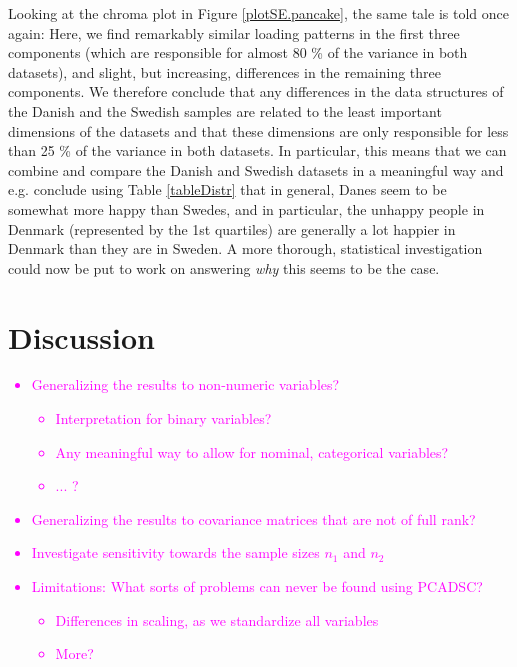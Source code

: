 \documentclass[titlepage,11pt,twoside]{article}
\newcommand{\hl}[1]{\textcolor{magenta}{#1}}
\begin{document}
Looking at the chroma plot in Figure \ref{plotSE.pancake}, the same tale is told once again: Here, we find remarkably similar loading patterns in the first three components (which are responsible for almost 80 \% of the variance in both datasets), and slight, but increasing, differences in the remaining three components. We therefore conclude that any differences in the data structures of the Danish and the Swedish samples are related to the least important dimensions of the datasets and that these dimensions are only responsible for less than 25 \% of the variance in both datasets. In particular, this means that we can combine and compare the Danish and Swedish datasets in a meaningful way and e.g. conclude using Table \ref{tableDistr} that in general, Danes seem to be somewhat more happy than Swedes, and in particular, the unhappy people in Denmark (represented by the 1st quartiles) are generally a lot happier in Denmark than they are in Sweden. A more thorough, statistical investigation could now be put to work on answering \textit{why} this seems to be the case. 

\section{Discussion}
\label{sec:discussion}
\hl{
\begin{itemize}
\item Generalizing the results to non-numeric variables?
	\begin{itemize}
		\item Interpretation for binary variables?
		\item Any meaningful way to allow for nominal, categorical variables?
		\item ... ?
	\end{itemize}
\item Generalizing the results to covariance matrices that are not of full rank?
\item Investigate sensitivity towards the sample sizes $n_1$ and $n_2$
\item Limitations: What sorts of problems can never be found using PCADSC? 
\begin{itemize}
\item Differences in scaling, as we standardize all variables
\item More?
\end{itemize}
\end{itemize}
}


\vspace{\fill}\clearpage
\newpage


\end{document}
